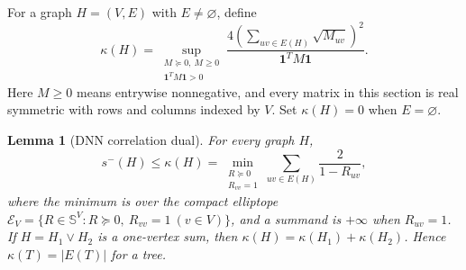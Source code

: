 \documentclass[11pt]{article}
\newtheorem{lemma}[theorem]{Lemma}
\theoremstyle{remark}
\newcommand{\smn}{s^-}
\newcommand{\kap}{\kappa}
\newcommand{\one}{\mathbf 1}
\begin{document}
For a graph $H=(V,E)$ with $E\ne\varnothing$, define
\begin{equation}\label{eq:kappa}
 \kap(H)=\sup_{\substack{M\succeq0,\ M\ge0\\\one^TM\one>0}}
 \frac{4(\sum_{uv\in E(H)}\sqrt{M_{uv}})^2}{\one^TM\one}.
\end{equation}
Here $M\ge0$ means entrywise nonnegative, and every matrix in this section is
real symmetric with rows and columns indexed by $V$.  Set $\kap(H)=0$ when
$E=\varnothing$.

\begin{lemma}[DNN correlation dual]\label{lem:dnn}
For every graph $H$,
\begin{equation}\label{eq:dual}
 \smn(H)\le\kap(H)=
 \min_{\substack{R\succeq0\\R_{vv}=1}}
 \sum_{uv\in E(H)}\frac{2}{1-R_{uv}},
\end{equation}
where the minimum is over the compact elliptope
$\mathcal E_V=\{R\in\mathbb S^V:R\succeq0,\ R_{vv}=1\ (v\in V)\}$, and a
summand is $+\infty$ when $R_{uv}=1$.  If $H=H_1\vee H_2$ is a one-vertex
sum, then $\kap(H)=\kap(H_1)+\kap(H_2)$.  Hence $\kap(T)=|E(T)|$ for a tree.
\end{lemma}
\end{document}
